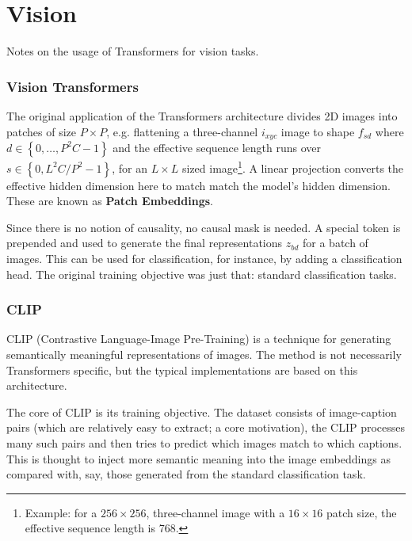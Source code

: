 \part{Vision}

Notes on the usage of Transformers for vision tasks.

\section{Vision Transformers \label{sec_vit}}

The original application of the Transformers architecture \cite{dosovitskiy2021imageworth16x16words}
divides 2D images into patches of size $ P\times P $, e.g. flattening a three-channel $ i _{xyc} $
image to shape $ f _{ s d  } $ where $ d \in \left \{ 0, \ldots , P ^{ 2 }C-1 \right \} $ and the
effective sequence length runs over $ s \in \left \{ 0, L ^{ 2 }C /P ^{ 2 }-1 \right \} $, for an $
L\times L $ sized image\footnote{Example: for a $ 256\times 256 $, three-channel image with a $
16\times 16 $ patch size, the effective sequence length is 768.}. A linear projection converts the
effective hidden dimension here to match match the model's hidden dimension. These are known as
\textbf{Patch Embeddings}.

Since there is no notion of causality, no causal mask is needed. A special \pyinline{[CLS]} token is
prepended and used to generate the final representations $ z _{ bd } $ for a batch of images. This
can be used for classification, for instance, by adding a classification head.  The original
training objective was just that: standard classification tasks.



\section{CLIP \label{sec_clip}}

CLIP (Contrastive Language-Image Pre-Training) \cite{radford2021learningtransferablevisualmodels} is
a technique for generating semantically meaningful representations of images. The method is not
necessarily Transformers specific, but the typical implementations are based on this architecture.

The core of CLIP is its training objective. The dataset consists of image-caption pairs (which are
relatively easy to extract; a core motivation), the CLIP processes many such pairs and then tries to
predict which images match to which captions. This is thought to inject more semantic meaning into
the image embeddings as compared with, say, those generated from the standard classification task.

